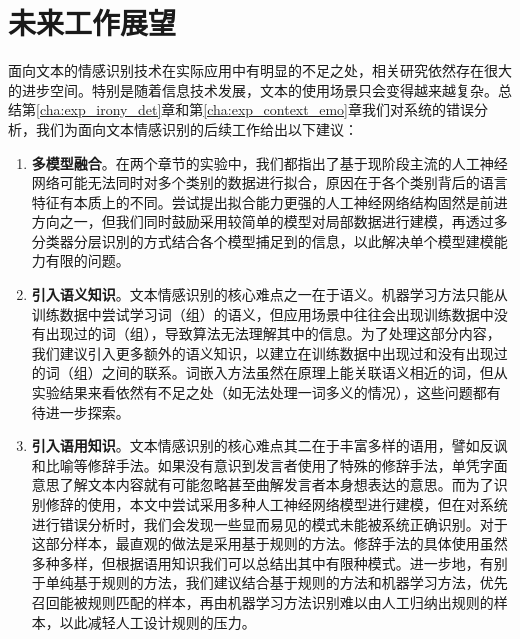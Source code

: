 \section{未来工作展望}

面向文本的情感识别技术在实际应用中有明显的不足之处，相关研究依然存在很大的进步空间。特别是随着信息技术发展，文本的使用场景只会变得越来越复杂。总结第\ref{cha:exp_irony_det}章和第\ref{cha:exp_context_emo}章我们对系统的错误分析，我们为面向文本情感识别的后续工作给出以下建议：

\begin{enumerate}

\item {\bf 多模型融合}。在两个章节的实验中，我们都指出了基于现阶段主流的人工神经网络可能无法同时对多个类别的数据进行拟合，原因在于各个类别背后的语言特征有本质上的不同。尝试提出拟合能力更强的人工神经网络结构固然是前进方向之一，但我们同时鼓励采用较简单的模型对局部数据进行建模，再透过多分类器分层识別的方式结合各个模型捕足到的信息，以此解决单个模型建模能力有限的问题。

\item {\bf 引入语义知识}。文本情感识别的核心难点之一在于语义。机器学习方法只能从训练数据中尝试学习词（组）的语义，但应用场景中往往会出现训练数据中没有出现过的词（组），导致算法无法理解其中的信息。为了处理这部分内容，我们建议引入更多额外的语义知识，以建立在训练数据中出现过和没有出现过的词（组）之间的联系。词嵌入方法虽然在原理上能关联语义相近的词，但从实验结果来看依然有不足之处（如无法处理一词多义的情况），这些问题都有待进一步探索。

\item {\bf 引入语用知识}。文本情感识别的核心难点其二在于丰富多样的语用，譬如反讽和比喻等修辞手法。如果没有意识到发言者使用了特殊的修辞手法，单凭字面意思了解文本内容就有可能忽略甚至曲解发言者本身想表达的意思。而为了识别修辞的使用，本文中尝试采用多种人工神经网络模型进行建模，但在对系统进行错误分析时，我们会发现一些显而易见的模式未能被系统正确识别。对于这部分样本，最直观的做法是采用基于规则的方法。修辞手法的具体使用虽然多种多样，但根据语用知识我们可以总结出其中有限种模式。进一步地，有别于单纯基于规则的方法，我们建议结合基于规则的方法和机器学习方法，优先召回能被规则匹配的样本，再由机器学习方法识别难以由人工归纳出规则的样本，以此减轻人工设计规则的压力。

\end{enumerate}







